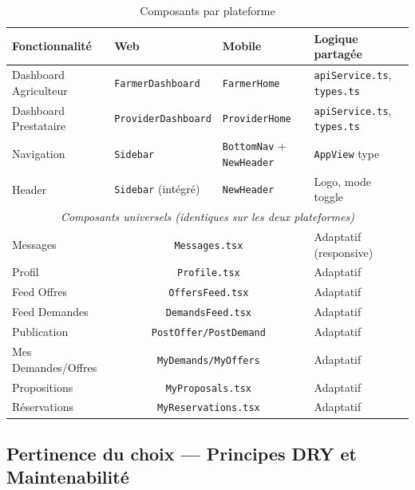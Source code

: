 \documentclass[12pt, a4paper]{article}
\begin{document}
\begin{table}[h!]
\centering
\caption{Composants par plateforme}
\begin{tabularx}{\textwidth}{l l l X}
\toprule
\textbf{Fonctionnalité} & \textbf{Web} & \textbf{Mobile} & \textbf{Logique partagée} \\
\midrule
Dashboard Agriculteur & \texttt{FarmerDashboard} & \texttt{FarmerHome} & \texttt{apiService.ts}, \texttt{types.ts} \\
Dashboard Prestataire & \texttt{ProviderDashboard} & \texttt{ProviderHome} & \texttt{apiService.ts}, \texttt{types.ts} \\
Navigation            & \texttt{Sidebar}            & \texttt{BottomNav} + \texttt{NewHeader} & \texttt{AppView} type \\
Header                & \texttt{Sidebar} (intégré)  & \texttt{NewHeader} & Logo, mode toggle \\
\midrule
\multicolumn{4}{c}{\textit{Composants universels (identiques sur les deux plateformes)}} \\
\midrule
Messages              & \multicolumn{2}{c}{\texttt{Messages.tsx}}        & Adaptatif (responsive) \\
Profil                & \multicolumn{2}{c}{\texttt{Profile.tsx}}         & Adaptatif \\
Feed Offres           & \multicolumn{2}{c}{\texttt{OffersFeed.tsx}}      & Adaptatif \\
Feed Demandes         & \multicolumn{2}{c}{\texttt{DemandsFeed.tsx}}     & Adaptatif \\
Publication           & \multicolumn{2}{c}{\texttt{PostOffer/PostDemand}} & Adaptatif \\
Mes Demandes/Offres   & \multicolumn{2}{c}{\texttt{MyDemands/MyOffers}}  & Adaptatif \\
Propositions          & \multicolumn{2}{c}{\texttt{MyProposals.tsx}}     & Adaptatif \\
Réservations          & \multicolumn{2}{c}{\texttt{MyReservations.tsx}}  & Adaptatif \\
\bottomrule
\end{tabularx}
\end{table}

\subsection{Pertinence du choix — Principes DRY et Maintenabilité}
\end{document}

